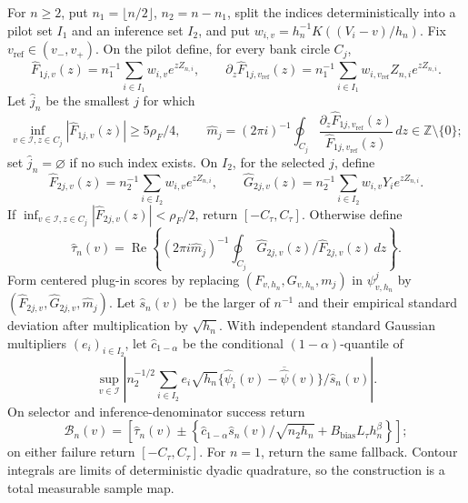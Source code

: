 For \(n\ge2\), put \(n_1=\lfloor n/2\rfloor\), \(n_2=n-n_1\), split the indices deterministically into a pilot set \(I_1\) and an inference set \(I_2\), and put \(w_{i,v}=h_n^{-1}K((V_i-v)/h_n)\). Fix \(v_{\mathrm{ref}}\in(v_-,v_+)\). On the pilot define, for every bank circle \(C_j\),
\[
 \widehat F_{1j,v}(z)=n_1^{-1}\sum_{i\in I_1}w_{i,v}e^{zZ_{n,i}},\qquad
 \partial_z\widehat F_{1j,v_{\mathrm{ref}}}(z)
 =n_1^{-1}\sum_{i\in I_1}w_{i,v_{\mathrm{ref}}}Z_{n,i}e^{zZ_{n,i}}.
\]
Let \(\widehat j_n\) be the smallest \(j\) for which
\[
 \inf_{v\in\mathcal I,z\in C_j}|\widehat F_{1j,v}(z)|
 \ge5\rho_F/4,
 \qquad
 \widehat m_j=(2\pi i)^{-1}\oint_{C_j}
 \frac{\partial_z\widehat F_{1j,v_{\mathrm{ref}}}(z)}
 {\widehat F_{1j,v_{\mathrm{ref}}}(z)}\,dz
 \in\mathbb Z\setminus\{0\};
\]
set \(\widehat j_n=\varnothing\) if no such index exists. On \(I_2\), for the selected \(j\), define
\[
 \widehat F_{2j,v}(z)=n_2^{-1}\sum_{i\in I_2}w_{i,v}e^{zZ_{n,i}},\qquad
 \widehat G_{2j,v}(z)=n_2^{-1}\sum_{i\in I_2}w_{i,v}Y_i e^{zZ_{n,i}}.
\]
If \(\inf_{v\in\mathcal I,z\in C_j}|\widehat F_{2j,v}(z)|<\rho_F/2\), return \([-C_\tau,C_\tau]\). Otherwise define
\[
 \widehat\tau_n(v)=\operatorname{Re}\left\{(2\pi i\widehat m_j)^{-1}
 \oint_{C_j}\widehat G_{2j,v}(z)/\widehat F_{2j,v}(z)\,dz\right\}.
\]
Form centered plug-in scores by replacing \((F_{v,h_n},G_{v,h_n},m_j)\) in \(\psi^j_{v,h_n}\) by \((\widehat F_{2j,v},\widehat G_{2j,v},\widehat m_j)\). Let \(\widehat s_n(v)\) be the larger of \(n^{-1}\) and their empirical standard deviation after multiplication by \(\sqrt{h_n}\). With independent standard Gaussian multipliers \((e_i)_{i\in I_2}\), let \(\widehat c_{1-\alpha}\) be the conditional \((1-\alpha)\)-quantile of
\[
 \sup_{v\in\mathcal I}\left|n_2^{-1/2}\sum_{i\in I_2}e_i\sqrt{h_n}
 \{\widehat\psi_i(v)-\overline{\widehat\psi}(v)\}/\widehat s_n(v)\right|.
\]
On selector and inference-denominator success return
\[
 \mathcal B_n(v)=\left[\widehat\tau_n(v)\pm
 \left\{\widehat c_{1-\alpha}\widehat s_n(v)/\sqrt{n_2h_n}
 +B_{\mathrm{bias}}L_\tau h_n^\beta\right\}\right];
\]
on either failure return \([-C_\tau,C_\tau]\). For \(n=1\), return the same fallback. Contour integrals are limits of deterministic dyadic quadrature, so the construction is a total measurable sample map.